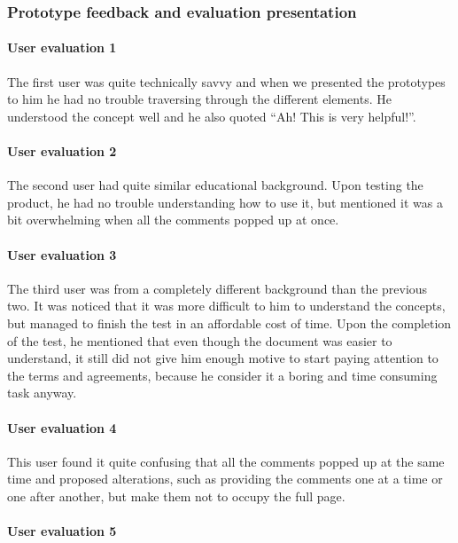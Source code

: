 \subsubsection{Prototype feedback and evaluation presentation}

\paragraph{User evaluation 1}

The first user was quite technically savvy and when we presented the prototypes 
to him he had no trouble traversing through the different elements. He 
understood the concept well and he also quoted ``Ah! This is very helpful!''.

\paragraph{User evaluation 2}

The second user had quite similar educational background. Upon testing the 
product, he had no trouble understanding how to use it, but mentioned it was a 
bit overwhelming when all the comments popped up at once.

\paragraph{User evaluation 3}

The third user was from a completely different background than the previous two. 
It was noticed that it was more difficult to him to understand the concepts, but 
managed to finish the test in an affordable cost of time. Upon the completion of 
the test, he mentioned that even though the document was easier to understand, 
it still did not give him enough motive to start paying attention to the terms 
and agreements, because he consider it a boring and time consuming task anyway.

\paragraph{User evaluation 4}

This user found it quite confusing that all the comments popped up at the same 
time and proposed alterations, such as providing the comments one at a time or 
one after another, but make them not to occupy the full page.

\paragraph{User evaluation 5}

